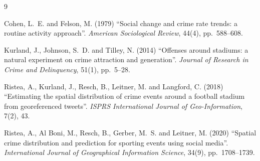 \documentclass[12pt]{article}
\begin{document}
\begin{thebibliography}{9}

 Cohen, L.~E. and Felson, M. (1979) ``Social change and
crime rate trends: a routine activity approach''. \emph{American Sociological
Review}, 44(4), pp.~588--608.

 Kurland, J., Johnson, S.~D. and Tilley, N. (2014)
``Offenses around stadiums: a natural experiment on crime attraction and
generation''. \emph{Journal of Research in Crime and Delinquency}, 51(1),
pp.~5--28.

 Ristea, A., Kurland, J., Resch, B., Leitner, M. and
Langford, C. (2018) ``Estimating the spatial distribution of crime events
around a football stadium from georeferenced tweets''. \emph{ISPRS
International Journal of Geo-Information}, 7(2), 43.

 Ristea, A., Al Boni, M., Resch, B., Gerber, M.~S. and
Leitner, M. (2020) ``Spatial crime distribution and prediction for sporting
events using social media''. \emph{International Journal of Geographical
Information Science}, 34(9), pp.~1708--1739.

\end{thebibliography}
\end{document}

